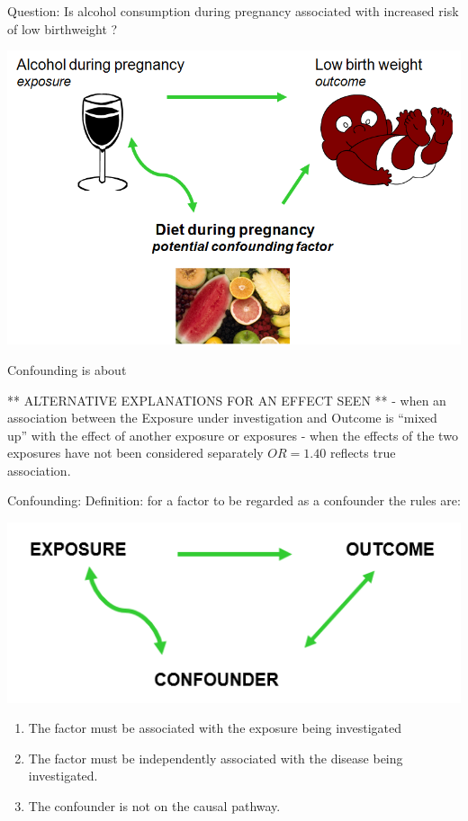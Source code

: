 \documentclass[ignorenonframetext,]{beamer}
\begin{document}
\begin{frame}{Question: Is alcohol consumption during pregnancy
associated with increased risk of low birthweight ?}

\includegraphics{lifestyle8.png}

\end{frame}

\begin{frame}{Confounding is about}

** ALTERNATIVE EXPLANATIONS FOR AN EFFECT SEEN ** - when an association
between the Exposure under investigation and Outcome is ``mixed up''
with the effect of another exposure or exposures - when the effects of
the two exposures have not been considered separately \(OR = 1.40\)
reflects true association.

\end{frame}

\begin{frame}{Confounding: Definition: for a factor to be regarded as a
confounder the rules are:}

\includegraphics{exposure.png}

\begin{enumerate}
\def\labelenumi{\arabic{enumi}.}
\itemsep1pt\parskip0pt
\item
  The factor must be associated with the exposure being investigated
\item
  The factor must be independently associated with the disease being
  investigated.
\item
  The confounder is not on the causal pathway.
\end{enumerate}

\end{frame}
\end{document}
